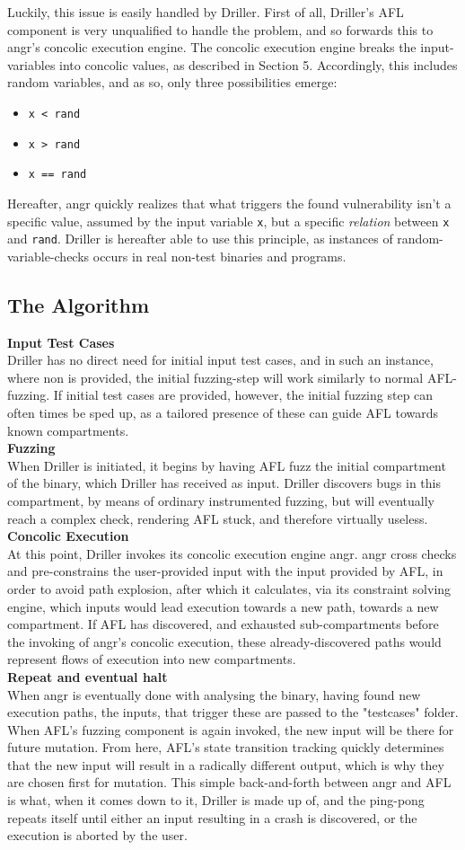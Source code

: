 \documentclass[a4paper]{article}
\newcommand{\tbf}[1]{\textbf{#1}}
\newcommand{\tit}[1]{\textit{#1}}
\newcommand{\ttt}[1]{\texttt{#1}}
\newcommand{\subsubsubsection}[1]{\tbf{#1}\\}
\begin{document}
Luckily, this issue is easily handled by Driller. First of all, Driller's AFL component is very unqualified to handle the problem, and so forwards this to angr's concolic execution engine. The concolic execution engine breaks the input-variables into concolic values, as described in Section 5. Accordingly, this includes random variables, and as so, only three possibilities emerge:
\begin{itemize}[noitemsep]
	\item \ttt{x < rand}
	\item \ttt{x > rand}
	\item \ttt{x == rand}
\end{itemize}
Hereafter, angr quickly realizes that what triggers the found vulnerability isn't a specific value, assumed by the input variable \ttt{x}, but a specific \tit{relation} between \ttt{x} and \ttt{rand}. Driller is hereafter able to use this principle, as instances of random-variable-checks occurs in real non-test binaries and programs.
\subsection{The Algorithm}
\label{sec:TheAlgorithm}
\subsubsubsection{Input Test Cases}
Driller has no direct need for initial input test cases, and in such an instance, where non is provided, the initial fuzzing-step will work similarly to normal AFL-fuzzing. If initial test cases are provided, however, the initial fuzzing step can often times be sped up, as a tailored presence of these can guide AFL towards known compartments.\\
\subsubsubsection{Fuzzing}
When Driller is initiated, it begins by having AFL fuzz the initial compartment of the binary, which Driller has received as input. Driller discovers bugs in this compartment, by means of ordinary instrumented fuzzing, but will eventually reach a complex check, rendering AFL stuck, and therefore virtually useless.\\
\subsubsubsection{Concolic Execution}
At this point, Driller invokes its concolic execution engine angr. angr cross checks and pre-constrains the user-provided input with the input provided by AFL, in order to avoid path explosion, after which it calculates, via its constraint solving engine, which inputs would lead execution towards a new path, towards a new compartment. If AFL has discovered, and exhausted sub-compartments before the invoking of angr's concolic execution, these already-discovered paths would represent flows of execution into new compartments.\\
\subsubsubsection{Repeat and eventual halt}
When angr is eventually done with analysing the binary, having found new execution paths, the inputs, that trigger these are passed to the "testcases" folder. When AFL's fuzzing component is again invoked, the new input will be there for future mutation. From here, AFL's state transition tracking quickly determines that the new input will result in a radically different output, which is why they are chosen first for mutation. This simple back-and-forth between angr and AFL is what, when it comes down to it, Driller is made up of, and the ping-pong repeats itself until either an input resulting in a crash is discovered, or the execution is aborted by the user. 
\end{document}
